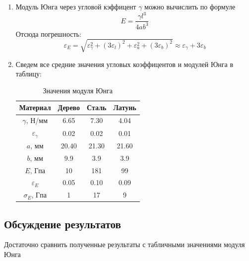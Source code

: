 \documentclass[12pt]{article}
\begin{document}
\begin{enumerate}
        \item Модуль Юнга через угловой кэффицент $\gamma$ можно
        вычислить по формуле
        \begin{equation}
            E = \frac{\gamma l^3}{4ab^3}
        \end{equation}
        Отсюда погрешность:
        \begin{equation*}
            \varepsilon_E = \sqrt{\varepsilon_{\gamma}^2 + (3\varepsilon_l)^2
            +\varepsilon_a^2 + (3\varepsilon_b)^2} \approx
            \varepsilon_{\gamma} + 3\varepsilon_b
        \end{equation*}
        \item Сведем все средние значения угловых коэффицентов и модулей
        Юнга в таблицу:
        \begin{table}[H]
            \centering
            \caption{Значения модуля Юнга}
            \begin{tabular}{|c|c|c|c|}
            \hline
            Материал               & Дерево & Сталь & Латунь \\ \hline
            $\gamma$, Н/мм         & 6.65   & 7.30  & 4.04   \\ \hline
            $\varepsilon_{\gamma}$ & 0.02   & 0.02  & 0.01   \\ \hline
            $a$, мм                & 20.40  & 21.30 & 21.60  \\ \hline
            $b$, мм                & 9.9    & 3.9   & 3.9    \\ \hline
            $E$, Гпа               & 10     & 181   & 99     \\ \hline
            $\varepsilon_E$        & 0.05   & 0.10  & 0.09   \\ \hline
            $\sigma_E$, Гпа        & 1      & 17    & 9      \\ \hline
            \end{tabular}
        \end{table}

    \end{enumerate}

    \subsection{Обсуждение результатов}
    Достаточно сравнить полученные результаты с табличными значениями
    модуля Юнга
\end{document}
